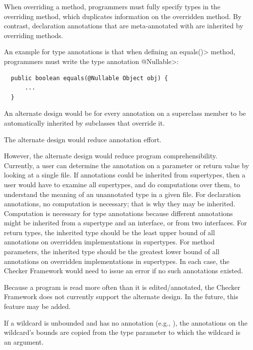 
When overriding a method, programmers must fully specify types in the overriding
method, which duplicates information on the overridden method.
By contrast, declaration annotations that are meta-annotated with
 are inherited by overriding methods.

An example for type annotations is that when defining an \<equals()>
method, programmers must write the type annotation \<@Nullable>:

\begin{Verbatim}
  public boolean equals(@Nullable Object obj) {
      ...
  }
\end{Verbatim}

An alternate design would be for every annotation on a superclass member to
be automatically inherited by subclasses that override it.

The alternate design would reduce annotation effort.

However, the alternate design would reduce program comprehensibility.
Currently, a user can determine the annotation on a parameter or return
value by looking at a single file.  If annotations could be inherited from
supertypes, then a user would have to examine all supertypes, and do
computations over them, to understand the meaning of an unannotated type in
a given file.
For declaration annotations, no computation is necessary; that is why they
may be inherited.
Computation is necessary for type annotations because different annotations might be inherited
from a supertype and an interface, or from two interfaces.  For return
types, the inherited type should be the least upper bound of all
annotations on overridden implementations in supertypes.  For method
parameters, the inherited type should be the greatest lower bound of all
annotations on overridden implementations in supertypes.  In each case, the
Checker Framework would need to issue an error if no such annotations existed.

Because a program is read more often than it is edited/annotated, the
Checker Framework does not currently support the alternate design.  In the
future, this feature may be added.



If a wildcard is unbounded and has no annotation (e.g., ),
the annotations on the wildcard's bounds are copied from the type parameter
to which the wildcard is an argument.

